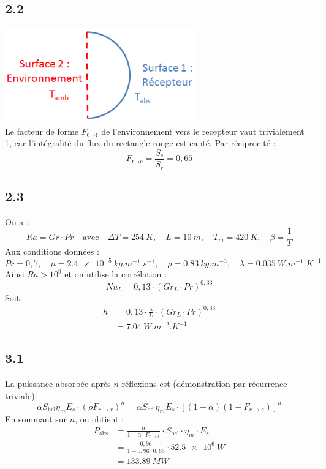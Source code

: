 \documentclass[12pt]{article}
\begin{document}
\subsection*{2.2}
\includegraphics[scale=0.5]{img1.png} \\
Le facteur de forme \( F_{\text{e} \rightarrow \text{r}} \) de l'environnement vers le recepteur vaut trivialement 1, car l'intégralité du flux du rectangle rouge est capté. Par réciprocité :
\[
F_{\text{r} \rightarrow \text{e}} = \frac{S_e}{S_r} = \boxed{0{,}65}
\]

\subsection*{2.3}
On a :
\[
Ra = Gr \cdot Pr
\quad \text{avec} \quad 
\Delta T = \SI{254}{K},\quad L = \SI{10}{m},\quad T_m = \SI{420}{K},\quad \beta = \frac{1}{T}
\]
Aux conditions données :
\[
Pr = 0{,}7,\quad \mu = \SI{2,4e-5}{kg.m^{-1}.s^{-1}},\quad \rho = \SI{0,83}{kg.m^{-3}}, \quad \lambda = \SI{0,035}{W.m^{-1}.K^{-1}}
\]
Ainsi $Ra > 10^9$ et on utilise la corrélation :
\[
Nu_L = 0{,}13 \cdot (Gr_L \cdot Pr)^{0{,}33}
\]
Soit 
\begin{align*}
h &= 0{,}13 \cdot \frac{\lambda}{L} \cdot (Gr_L \cdot Pr)^{0{,}33} \\
&= \boxed{\SI{7,04}{W.m^{-2}.K^{-1}}}
\end{align*}

\subsection*{3.1}
La puissance absorbée après \( n \) réflexions est (démonstration par récurrence triviale):
\[
\alpha S_{\text{hel}} \eta_m E_s \cdot (\rho F_{r \rightarrow r})^n = \alpha S_{\text{hel}} \eta_m E_s \cdot \left[(1 - \alpha)(1 - F_{r \rightarrow e})\right]^n
\]
En sommant sur \( n \), on obtient :
\begin{align*}
P_{\text{abs}} &= \frac{\alpha}{1 - \alpha \cdot F_{r \rightarrow e}} \cdot S_{\text{hel}} \cdot \eta_m \cdot E_s \\
&= \frac{0{,}96}{1 - 0{,}96 \cdot 0{,}65} \cdot \SI{52.5e6}{W} \\
&= \boxed{\SI{133,89}{MW}}
\end{align*}
\end{document}
